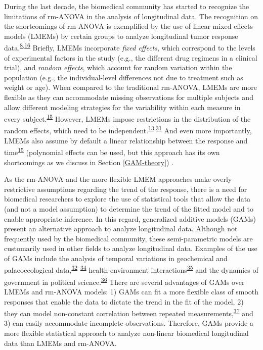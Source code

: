 \documentclass[
]{article}
\begin{document}
During the last decade, the biomedical community has started to recognize the limitations of rm-ANOVA in the analysis of longitudinal data. The recognition on the shortcomings of rm-ANOVA is exemplified by the use of linear mixed effects models (LMEMs) by certain groups to analyze longitudinal tumor response data.\textsuperscript{\protect\hyperlink{ref-skala2010}{8},\protect\hyperlink{ref-vishwanath2009}{16}} Briefly, LMEMs incorporate \emph{fixed effects}, which correspond to the levels of experimental factors in the study (e.g., the different drug regimens in a clinical trial), and \emph{random effects}, which account for random variation within the population (e.g., the individual-level differences not due to treatment such as weight or age). When compared to the traditional rm-ANOVA, LMEMs are more flexible as they can accommodate missing observations for multiple subjects and allow different modeling strategies for the variability within each measure in every subject.\textsuperscript{\protect\hyperlink{ref-pinheiro2006}{15}} However, LMEMs impose restrictions in the distribution of the random effects, which need to be independent.\textsuperscript{\protect\hyperlink{ref-gueorguieva2004}{13},\protect\hyperlink{ref-barr2013}{31}} And even more importantly, LMEMs also assume by default a linear relationship between the response and time\textsuperscript{\protect\hyperlink{ref-pinheiro2006}{15}} (polynomial effects can be used, but this approach has its own shortcomings as we discuss in Section \ref{GAM-theory}) .

As the rm-ANOVA and the more flexible LMEM approaches make overly restrictive assumptions regarding the trend of the response, there is a need for biomedical researchers to explore the use of statistical tools that allow the data (and not a model assumption) to determine the trend of the fitted model and to enable appropriate inference. In this regard, generalized additive models (GAMs) present an alternative approach to analyze longitudinal data. Although not frequently used by the biomedical community, these semi-parametric models are customarily used in other fields to analyze longitudinal data. Examples of the use of GAMs include the analysis of temporal variations in geochemical and palaeoecological data,\textsuperscript{\protect\hyperlink{ref-rose2012}{32}--\protect\hyperlink{ref-simpson2018}{34}} health-environment interactions\textsuperscript{\protect\hyperlink{ref-yang2012}{35}} and the dynamics of government in political science.\textsuperscript{\protect\hyperlink{ref-beck1998}{36}} There are several advantages of GAMs over LMEMs and rm-ANOVA models: 1) GAMs can fit a more flexible class of smooth responses that enable the data to dictate the trend in the fit of the model, 2) they can model non-constant correlation between repeated measurements,\textsuperscript{\protect\hyperlink{ref-wood2017}{37}} and 3) can easily accommodate incomplete observations. Therefore, GAMs provide a more flexible statistical approach to analyze non-linear biomedical longitudinal data than LMEMs and rm-ANOVA.
\end{document}
